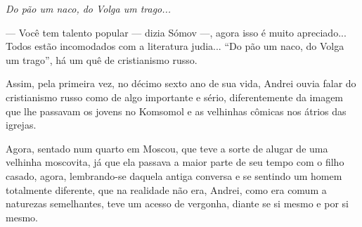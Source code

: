 \emph{Do pão um naco, do Volga um trago... }

--- Você tem talento popular --- dizia Sómov ---, agora isso é muito
apreciado... Todos estão incomodados com a literatura judia... ``Do pão
um naco, do Volga um trago'', há um quê de cristianismo russo.

Assim, pela primeira vez, no décimo sexto ano de sua vida, Andrei ouvia
falar do cristianismo russo como de algo importante e sério,
diferentemente da imagem que lhe passavam os jovens no Komsomol e as
velhinhas cômicas nos átrios das igrejas.

Agora, sentado num quarto em Moscou, que teve a sorte de alugar de uma
velhinha moscovita, já que ela passava a maior parte de seu tempo com o
filho casado, agora, lembrando-se daquela antiga conversa e se sentindo
um homem totalmente diferente, que na realidade não era, Andrei, como
era comum a naturezas semelhantes, teve um acesso de vergonha, diante se
si mesmo e por si mesmo.

